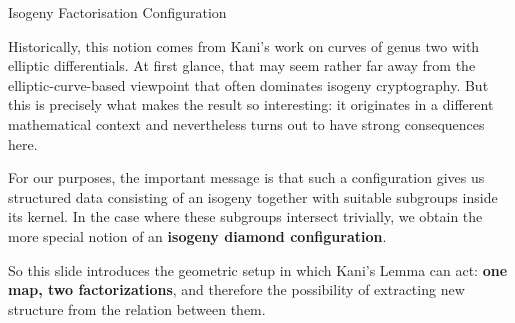 \documentclass[aspectratio=169,notheorems]{beamer}
\begin{document}
\begin{frame}{Isogeny Factorisation Configuration}
{			Historically, this notion comes from Kani's work on curves of genus two with elliptic differentials. At first glance, that may seem rather far away from the elliptic-curve-based viewpoint that often dominates isogeny cryptography. But this is precisely what makes the result so interesting: it originates in a different mathematical context and nevertheless turns out to have strong consequences here.
			
			For our purposes, the important message is that such a configuration gives us structured data consisting of an isogeny together with suitable subgroups inside its kernel. In the case where these subgroups intersect trivially, we obtain the more special notion of an \textbf{isogeny diamond configuration}.
			
			So this slide introduces the geometric setup in which Kani's Lemma can act: \textbf{one map, two factorizations}, and therefore the possibility of extracting new structure from the relation between them.
		}
	\end{frame}
	
\end{document}

